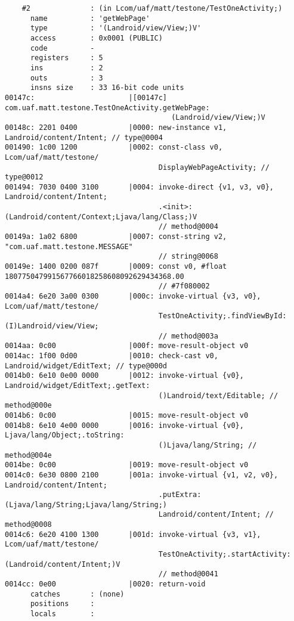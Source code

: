 \begin{lstlisting}
    #2              : (in Lcom/uaf/matt/testone/TestOneActivity;)
      name          : 'getWebPage'
      type          : '(Landroid/view/View;)V'
      access        : 0x0001 (PUBLIC)
      code          -
      registers     : 5
      ins           : 2
      outs          : 3
      insns size    : 33 16-bit code units
00147c:                      |[00147c] com.uaf.matt.testone.TestOneActivity.getWebPage:
                                       (Landroid/view/View;)V
00148c: 2201 0400            |0000: new-instance v1, Landroid/content/Intent; // type@0004
001490: 1c00 1200            |0002: const-class v0, Lcom/uaf/matt/testone/
                                    DisplayWebPageActivity; // type@0012
001494: 7030 0400 3100       |0004: invoke-direct {v1, v3, v0}, Landroid/content/Intent;
                                    .<init>:(Landroid/content/Context;Ljava/lang/Class;)V
                                    // method@0004
00149a: 1a02 6800            |0007: const-string v2, "com.uaf.matt.testone.MESSAGE"
                                    // string@0068
00149e: 1400 0200 087f       |0009: const v0, #float 180775047991567766018258608092629434368.00
                                    // #7f080002
0014a4: 6e20 3a00 0300       |000c: invoke-virtual {v3, v0}, Lcom/uaf/matt/testone/
                                    TestOneActivity;.findViewById:(I)Landroid/view/View;
                                    // method@003a
0014aa: 0c00                 |000f: move-result-object v0
0014ac: 1f00 0d00            |0010: check-cast v0, Landroid/widget/EditText; // type@000d
0014b0: 6e10 0e00 0000       |0012: invoke-virtual {v0}, Landroid/widget/EditText;.getText:
                                    ()Landroid/text/Editable; // method@000e
0014b6: 0c00                 |0015: move-result-object v0
0014b8: 6e10 4e00 0000       |0016: invoke-virtual {v0}, Ljava/lang/Object;.toString:
                                    ()Ljava/lang/String; // method@004e
0014be: 0c00                 |0019: move-result-object v0
0014c0: 6e30 0800 2100       |001a: invoke-virtual {v1, v2, v0}, Landroid/content/Intent;
                                    .putExtra:(Ljava/lang/String;Ljava/lang/String;)
                                    Landroid/content/Intent; // method@0008
0014c6: 6e20 4100 1300       |001d: invoke-virtual {v3, v1}, Lcom/uaf/matt/testone/
                                    TestOneActivity;.startActivity:(Landroid/content/Intent;)V
                                    // method@0041
0014cc: 0e00                 |0020: return-void
      catches       : (none)
      positions     :
      locals        :


\end{lstlisting}
